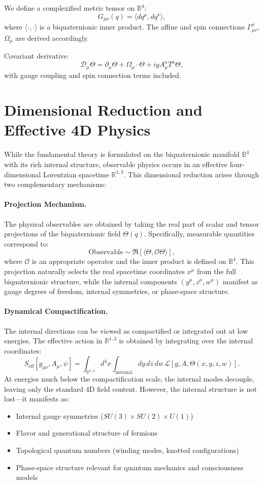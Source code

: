 \documentclass[12pt]{article}
\begin{document}
We define a complexified metric tensor on \( \mathbb{B}^4 \):
\[
G_{\mu\nu}(q) = \langle dq^\mu, dq^\nu \rangle,
\]
where \( \langle \cdot, \cdot \rangle \) is a biquaternionic inner product. The affine and spin connections \( \Gamma^\rho_{\mu\nu} \), \( \Omega_\mu \) are derived accordingly.

Covariant derivative:
\[
\mathcal{D}_\mu \Theta = \partial_\mu \Theta + \Omega_\mu \cdot \Theta + i g A_\mu^a T^a \Theta,
\]
with gauge coupling and spin connection terms included.

\section{Dimensional Reduction and Effective 4D Physics}

While the fundamental theory is formulated on the biquaternionic manifold \( \mathbb{B}^4 \) with its rich internal structure, observable physics occurs in an effective four-dimensional Lorentzian spacetime \( \mathbb{R}^{1,3} \). This dimensional reduction arises through two complementary mechanisms:

\paragraph{Projection Mechanism.}
The physical observables are obtained by taking the real part of scalar and tensor projections of the biquaternionic field \( \Theta(q) \). Specifically, measurable quantities correspond to:
\[
\text{Observable} \sim \Re[\langle \Theta, \mathcal{O} \Theta \rangle],
\]
where \( \mathcal{O} \) is an appropriate operator and the inner product is defined on \( \mathbb{B}^4 \). This projection naturally selects the real spacetime coordinates \( x^\mu \) from the full biquaternionic structure, while the internal components \( (y^\mu, z^\mu, w^\mu) \) manifest as gauge degrees of freedom, internal symmetries, or phase-space structure.

\paragraph{Dynamical Compactification.}
The internal directions can be viewed as compactified or integrated out at low energies. The effective action in \( \mathbb{R}^{1,3} \) is obtained by integrating over the internal coordinates:
\[
S_{\text{eff}}[g_{\mu\nu}, A_\mu, \psi] = \int_{\mathbb{R}^{1,3}} d^4x \int_{\text{internal}} dy\, dz\, dw \, \mathcal{L}[g, A, \Theta(x,y,z,w)].
\]
At energies much below the compactification scale, the internal modes decouple, leaving only the standard 4D field content. However, the internal structure is not lost—it manifests as:
\begin{itemize}
  \item Internal gauge symmetries (\( SU(3) \times SU(2) \times U(1) \))
  \item Flavor and generational structure of fermions
  \item Topological quantum numbers (winding modes, knotted configurations)
  \item Phase-space structure relevant for quantum mechanics and consciousness models
\end{itemize}
\end{document}
